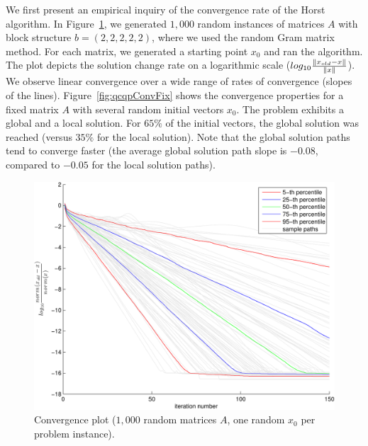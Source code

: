 We first present an empirical inquiry of the convergence rate of the
Horst algorithm. In Figure~\ref{fig:qcqpConvVar}, we
generated $1,000$ random  instances of matrices $A$ with block
structure $b = \left(2,2,2,2,2\right)$, where we used
the random Gram matrix method. For each matrix, we generated
a starting point $x_0$ and ran the algorithm. The plot depicts the
solution change rate on a logarithmic scale ($log_{10}
\frac{\lVert x_{old} - x\rVert}{\lVert x\rVert}$). We observe linear convergence
over a wide range of rates of convergence (slopes of the
lines). Figure~\ref{fig:qcqpConvFix} shows the convergence properties
for a fixed matrix $A$ with several random initial vectors $x_0$. The
problem exhibits a global and a local solution. For $65\%$ of the initial vectors,
the global solution was reached (versus $35\%$ for the local solution). Note that the global
solution paths tend to converge faster (the average global solution path slope
is  $-0.08$, compared  to $-0.05$ for the local solution paths).

\begin{figure}[htbp]
    \centering
    \includegraphics[width=\textwidth]{figures/convergenceBoxPlotDifferentA.pdf}
    \caption[Convergence rates: varying problem instances]{Convergence plot ($1,000$ random matrices $A$, one random $x_0$ per problem instance).}
    \label{fig:qcqpConvVar}
\end{figure}

